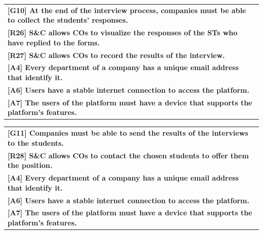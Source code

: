 \begin{center}
    \begin{tabular}{|p{37em}|}
        \rowcolor{bluepoli!40} %
        \hline
        \textbf{[G10] At the end of the interview process, companies must be able to collect the students' responses.} \\
        \rowcolor{bluepoli!15}
        \textbf{[R26] S\&C allows COs to visualize the responses of the STs who have replied to the forms.} \\
        \rowcolor{bluepoli!15}
        \textbf{[R27] S\&C allows COs to record the results of the interview.} \\
        \textbf{[A4] Every department of a company has a unique email address that identify it.}\\
        \textbf{[A6] Users have a stable internet connection to access the platform.}\\
        \textbf{[A7] The users of the platform must have a device that supports the platform's features.}\\
        \hline
    \end{tabular}
\end{center}

\begin{center}
    \begin{tabular}{|p{37em}|}
        \rowcolor{bluepoli!40} %
        \hline
        \textbf{[G11] Companies must be able to send the results of the interviews to the students.} \\
        \rowcolor{bluepoli!15}
        \textbf{[R28] S\&C allows COs to contact the chosen students to offer them the position.} \\
        \textbf{[A4] Every department of a company has a unique email address that identify it.}\\
        \textbf{[A6] Users have a stable internet connection to access the platform.}\\
        \textbf{[A7] The users of the platform must have a device that supports the platform's features.}\\

        \hline
    \end{tabular}
\end{center}

